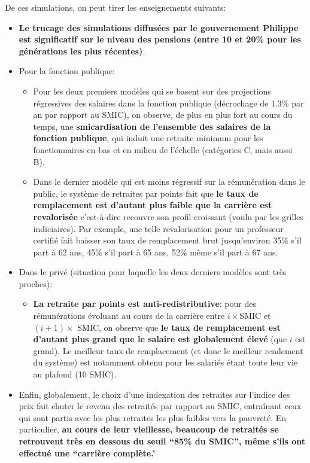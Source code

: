 \documentclass[a4paper,10pt]{report}
\begin{document}
De ces simulations, on peut tirer les enseignements suivants:
\begin{itemize}
\item {\bf Le trucage des simulations diffusées par le gouvernement Philippe est significatif sur le niveau des pensions (entre 10 et 20\% pour les générations les plus récentes)}. 
\item Pour la fonction publique:
  \begin{itemize}
  \item Pour les deux premiers modèles qui se basent sur des projections régressives des salaires dans la fonction publique (décrochage de 1.3\% par an par rapport au SMIC), on observe, de plus en plus fort au cours du temps,  une {\bf smicardisation de l'ensemble des salaires de la fonction publique}, qui induit une retraite minimum pour les fonctionnaires en bas et en milieu de l'échelle (catégories C, mais aussi B).
  \item Dans le dernier modèle qui est moins régressif sur la rémunération dans le public, le système de retraites par points fait que {\bf le taux de remplacement est d'autant plus faible que la carrière est revalorisée} c'est-à-dire recouvre son profil croissant (voulu par les grilles indiciaires). Par exemple, une telle revalorisation pour un professeur certifié fait baisser son taux de remplacement brut jusqu'environ 35\% s'il part à 62 ans, 45\% s'il part à 65 ans, 52\% même s'il part à 67 ans.
  \end{itemize}
\item Dans le privé (situation pour laquelle les deux derniers modèles sont très proches):
  \begin{itemize}
  \item {\bf La retraite par points est anti-redistributive}: pour des rémunérations évoluant au cours de la carrière entre $i \times$SMIC et $(i+1) \times$ SMIC, on observe que {\bf le taux de remplacement est d'autant plus grand que le salaire est globalement élevé} (que $i$ est grand). Le meilleur taux de remplacement (et donc le meilleur rendement du système) est notamment obtenu pour les salariés étant toute leur vie au plafond (10 SMIC).
  \end{itemize}
\item Enfin, globalement, le choix d'une indexation des retraites sur l'indice des prix fait chuter le revenu des retraités par rapport au SMIC, entraînant ceux qui sont partis avec les plus retraites les plus faibles vers la pauvreté. En particulier, {\bf au cours de leur vieillesse, beaucoup de retraités se retrouvent très en dessous du seuil ``85\% du SMIC'', même s'ils ont effectué une ``carrière complète.'}
\end{itemize}
\end{document}
